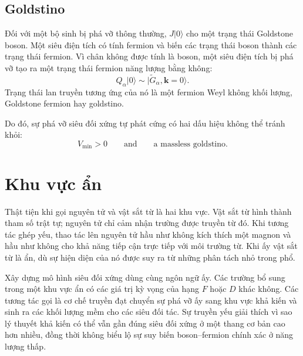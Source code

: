 \subsection{Goldstino}

Đối với một bộ sinh bị phá vỡ thông thường, \(J|0\rangle\) cho một trạng thái Goldstone boson. Một siêu điện tích có tính fermion và biến các trạng thái boson thành các trạng thái fermion. Vì chân không được tính là boson, một siêu điện tích bị phá vỡ tạo ra một trạng thái fermion năng lượng bằng không:
\begin{equation}
Q_\alpha|0\rangle
\sim
|\widetilde G_\alpha,\mathbf k=0\rangle.
\label{eq:l9-goldstino}
\end{equation}
Trạng thái lan truyền tương ứng của nó là một fermion Weyl không khối lượng, Goldstone fermion hay goldstino.

\begin{classroomqa}
\end{classroomqa}

Do đó, sự phá vỡ siêu đối xứng tự phát cứng có hai dấu hiệu không thể tránh khỏi:
\begin{equation}
\boxed{
V_{\min}>0
\qquad\text{and}\qquad
\text{a massless goldstino}.
}
\label{eq:l9-rigid-breaking-signatures}
\end{equation}

\section{Khu vực ẩn}

Thật tiện khi gọi nguyên tử và vật sắt từ là hai khu vực. Vật sắt từ hình thành tham số trật tự; nguyên tử chỉ cảm nhận trường được truyền từ đó. Khi tương tác ghép yếu, thao tác lên nguyên tử hầu như không kích thích một magnon và hầu như không cho khả năng tiếp cận trực tiếp với môi trường từ. Khi ấy vật sắt từ là ẩn, dù sự hiện diện của nó được suy ra từ những phân tách nhỏ trong phổ.

Xây dựng mô hình siêu đối xứng dùng cùng ngôn ngữ ấy. Các trường bổ sung trong một khu vực ẩn có các giá trị kỳ vọng của hạng \(F\) hoặc \(D\) khác không. Các tương tác gọi là cơ chế truyền đạt chuyển sự phá vỡ ấy sang khu vực khả kiến và sinh ra các khối lượng mềm cho các siêu đối tác. Sự truyền yếu giải thích vì sao lý thuyết khả kiến có thể vẫn gần đúng siêu đối xứng ở một thang cơ bản cao hơn nhiều, đồng thời không biểu lộ sự suy biến boson--fermion chính xác ở năng lượng thấp.

